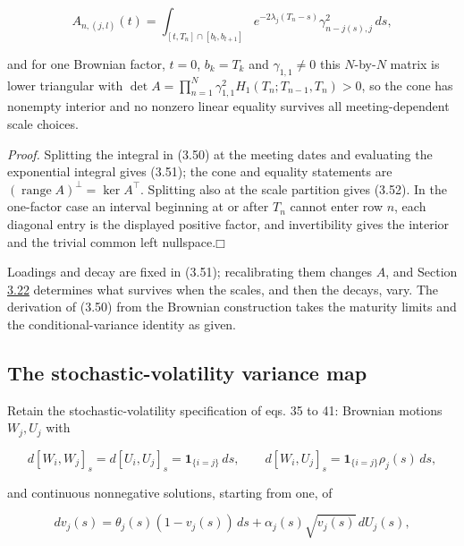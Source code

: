 \documentclass[11pt]{article}
\providecommand{\square}{\mdlgwhtsquare}
\begin{document}
\begin{equation*}
A_{n,(j,l)}(t) = \int_{[t, T_n] \cap [b_l, b_{l+1}]} e^{-2\lambda_j (T_n - s)} \gamma_{n - j(s), j}^2\,ds, \tag{3.52}\label{eq:3.52}
\end{equation*}

and for one Brownian factor, \(t = 0\), \(b_k = T_k\) and \(\gamma_{1,1} \ne 0\) this \(N\)-by-\(N\) matrix is lower triangular with \(\det A = \prod_{n=1}^N \gamma_{1,1}^2 H_1(T_n; T_{n-1}, T_n) > 0\), so the cone has nonempty interior and no nonzero linear equality survives all meeting-dependent scale choices.

\emph{Proof.} Splitting the integral in (3.50) at the meeting dates and evaluating the exponential integral gives (3.51); the cone and equality statements are \((\operatorname{range} A)^\perp = \ker A^\top\). Splitting also at the scale partition gives (3.52). In the one-factor case an interval beginning at or after \(T_n\) cannot enter row \(n\), each diagonal entry is the displayed positive factor, and invertibility gives the interior and the trivial common left nullspace.\hfill$\square$

Loadings and decay are fixed in (3.51); recalibrating them changes \(A\), and Section \hyperref[sec:3.22]{3.22} determines what survives when the scales, and then the decays, vary. The derivation of (3.50) from the Brownian construction takes the maturity limits and the conditional-variance identity as given.

\subsection{The stochastic-volatility variance map}\label{sec:3.12}

Retain the stochastic-volatility specification of \cite{brace2024sofr} eqs. 35 to 41: Brownian motions \(W_j, U_j\) with

\begin{equation*}
d[W_i, W_j]_s = d[U_i, U_j]_s = \mathbf 1_{\{i = j\}}\,ds, \qquad d[W_i, U_j]_s = \mathbf 1_{\{i = j\}} \rho_j(s)\,ds, \tag{3.53}\label{eq:3.53}
\end{equation*}

and continuous nonnegative solutions, starting from one, of

\begin{equation*}
dv_j(s) = \theta_j(s)(1 - v_j(s))\,ds + \alpha_j(s) \sqrt{v_j(s)}\,dU_j(s), \tag{3.54}\label{eq:3.54}
\end{equation*}
\end{document}
